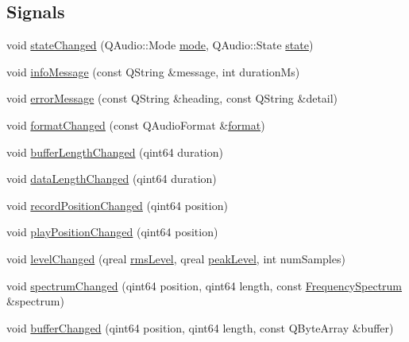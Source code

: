 \subsection*{Signals}
\begin{DoxyCompactItemize}
\item 
void \hyperlink{class_engine_abd773c71dbe9b8433062dda03b40dc2e}{state\+Changed} (Q\+Audio\+::\+Mode \hyperlink{class_engine_a63bb47972a1e0692432dd704a60e49bc}{mode}, Q\+Audio\+::\+State \hyperlink{class_engine_af21cf755f29c026ce0bc54f392d74adc}{state})
\item 
void \hyperlink{class_engine_a8b33312dbe69efdb8f5c311439015bc3}{info\+Message} (const Q\+String \&message, int duration\+Ms)
\item 
void \hyperlink{class_engine_a15540c6090eaa691b572d89d45d72e35}{error\+Message} (const Q\+String \&heading, const Q\+String \&detail)
\item 
void \hyperlink{class_engine_a08be5a3820381f266b3bf2b3a3b91549}{format\+Changed} (const Q\+Audio\+Format \&\hyperlink{class_engine_a275e6b498d8d956e10bdeeef9c494673}{format})
\item 
void \hyperlink{class_engine_a3870ec1ab9c7ee50a8126ffb5a2dbb04}{buffer\+Length\+Changed} (qint64 duration)
\item 
void \hyperlink{class_engine_a3316fdfd7db81a74416b8180c264f361}{data\+Length\+Changed} (qint64 duration)
\item 
void \hyperlink{class_engine_ad44be9915af75cf3dab1c3a5a4665693}{record\+Position\+Changed} (qint64 position)
\item 
void \hyperlink{class_engine_afe3298aca565219a67698bf7974a5257}{play\+Position\+Changed} (qint64 position)
\item 
void \hyperlink{class_engine_acccf2905ae48b05c44e9f4ec363079ab}{level\+Changed} (qreal \hyperlink{class_engine_a0a7764981d74fab25e390fa6f91aeb03}{rms\+Level}, qreal \hyperlink{class_engine_aab1cbc9a117974fe64cb0875a02792ab}{peak\+Level}, int num\+Samples)
\item 
void \hyperlink{class_engine_a99575be39ebf22f90a48ab2c23c2d482}{spectrum\+Changed} (qint64 position, qint64 length, const \hyperlink{class_frequency_spectrum}{Frequency\+Spectrum} \&spectrum)
\item 
void \hyperlink{class_engine_a4e54e59d1adc73cce8f6d2c4457dc06d}{buffer\+Changed} (qint64 position, qint64 length, const Q\+Byte\+Array \&buffer)
\end{DoxyCompactItemize}
